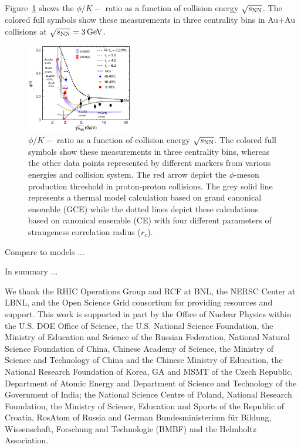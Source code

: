 \documentclass[%
 reprint,	
showpacs,
 amsmath,amssymb,
 aps,
 prc,
]{revtex4-1}
\begin{document}
Figure~\ref{fig:phi2Kratio} shows the $\phi/K-$ ratio as a function of collision energy $\sqrt{s_{\rm NN}}$. The colored full symbols show these measurements in three centrality bins in Au+Au collisions at ${\sqrt{s_{\rm NN}} = \rm{3\,GeV}}$.


\begin{figure}
\centering
\includegraphics[width=0.41\textwidth]{fig/fig4_phi_over_kminus_zoomin.eps}
  \caption{ $\phi/K-$ ratio as a function of collision energy $\sqrt{s_{\rm NN}}$. The colored full symbols show these measurements in three centrality bins, whereas the other data points represented by different markers from various energies and collision system. The red arrow depict the $\phi$-meson production threshold in proton-proton collisions. The grey solid line represents a thermal model calculation based on grand canonical ensemble (GCE) while the dotted lines depict these calculations based on canonical ensemble (CE) with four different parameters of strangeness correlation radius ($r_c$).}
\label{fig:phi2Kratio} 
\end{figure}

Compare to models ...


In summary ...




We thank the RHIC Operations Group and RCF at BNL, the NERSC Center at LBNL, and the Open Science Grid consortium for providing resources and support. This work is supported in part by the Office of Nuclear Physics within the U.S. DOE Office of Science, the U.S. National Science Foundation, the Ministry of Education and Science of the Russian Federation, National Natural Science Foundation of China, Chinese Academy of Science, the Ministry of Science and Technology of China and the Chinese Ministry of Education, the National Research Foundation of Korea, GA and MSMT of the Czech Republic, Department of Atomic Energy and Department of Science and Technology of the Government of India; the National Science Centre of Poland, National Research Foundation, the Ministry of Science, Education and Sports of the Republic of Croatia, RosAtom of Russia and German Bundesministerium f{\"u}r Bildung, Wissenschaft, Forschung and Technologie (BMBF) and the Helmholtz Association.


\end{document}
